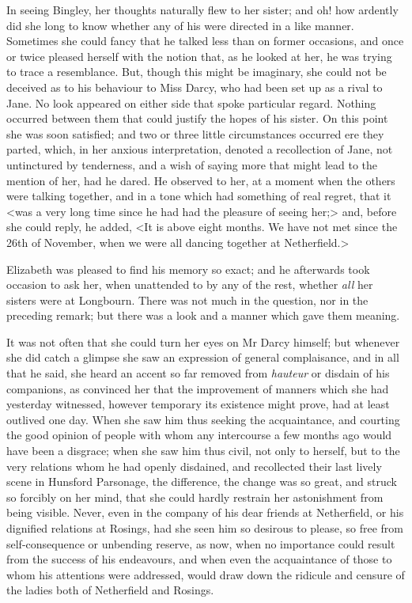 In seeing Bingley, her thoughts naturally flew to her sister; and oh! how ardently did she long to know whether any of his were directed in a like manner. Sometimes she could fancy that he talked less than on former occasions, and once or twice pleased herself with the notion that, as he looked at her, he was trying to trace a resemblance. But, though this might be imaginary, she could not be deceived as to his behaviour to Miss Darcy, who had been set up as a rival to Jane. No look appeared on either side that spoke particular regard. Nothing occurred between them that could justify the hopes of his sister. On this point she was soon satisfied; and two or three little circumstances occurred ere they parted, which, in her anxious interpretation, denoted a recollection of Jane, not untinctured by tenderness, and a wish of saying more that might lead to the mention of her, had he dared. He observed to her, at a moment when the others were talking together, and in a tone which had something of real regret, that it <was a very long time since he had had the pleasure of seeing her;> and, before she could reply, he added, <It is above eight months. We have not met since the 26th of November, when we were all dancing together at Netherfield.>

Elizabeth was pleased to find his memory so exact; and he afterwards took occasion to ask her, when unattended to by any of the rest, whether \textit{all} her sisters were at Longbourn. There was not much in the question, nor in the preceding remark; but there was a look and a manner which gave them meaning.

It was not often that she could turn her eyes on Mr Darcy himself; but whenever she did catch a glimpse she saw an expression of general complaisance, and in all that he said, she heard an accent so far removed from \textit{hauteur} or disdain of his companions, as convinced her that the improvement of manners which she had yesterday witnessed, however temporary its existence might prove, had at least outlived one day. When she saw him thus seeking the acquaintance, and courting the good opinion of people with whom any intercourse a few months ago would have been a disgrace; when she saw him thus civil, not only to herself, but to the very relations whom he had openly disdained, and recollected their last lively scene in Hunsford Parsonage, the difference, the change was so great, and struck so forcibly on her mind, that she could hardly restrain her astonishment from being visible. Never, even in the company of his dear friends at Netherfield, or his dignified relations at Rosings, had she seen him so desirous to please, so free from self-consequence or unbending reserve, as now, when no importance could result from the success of his endeavours, and when even the acquaintance of those to whom his attentions were addressed, would draw down the ridicule and censure of the ladies both of Netherfield and Rosings.

